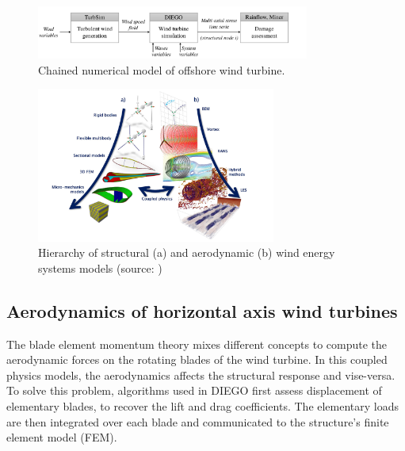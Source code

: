 \begin{figure}
    \centering
    \includegraphics[width=0.8\textwidth]{./part1/figures/chained_model.pdf}
    \caption{Chained numerical model of offshore wind turbine.}
    \label{fig:owt_chained_model}
\end{figure}


\begin{figure}
    \centering
    \includegraphics[width=0.7\textwidth]{./part1/figures/OWT_modeling_fidelities.png}
    \caption{Hierarchy of structural (a) and aerodynamic (b) wind energy systems models (source: \citet{veers_2019_review})}
    \label{fig:owt_modeling_fidelities}
\end{figure}



\subsection{Aerodynamics of horizontal axis wind turbines}

The blade element momentum theory mixes different concepts to compute the aerodynamic forces on the rotating blades of the wind turbine.
In this coupled physics models, the aerodynamics affects the structural response and vise-versa. 
To solve this problem, algorithms used in DIEGO first assess displacement of elementary blades, to recover the lift and drag coefficients. 
The elementary loads are then integrated over each blade and communicated to the structure's finite element model (FEM).


